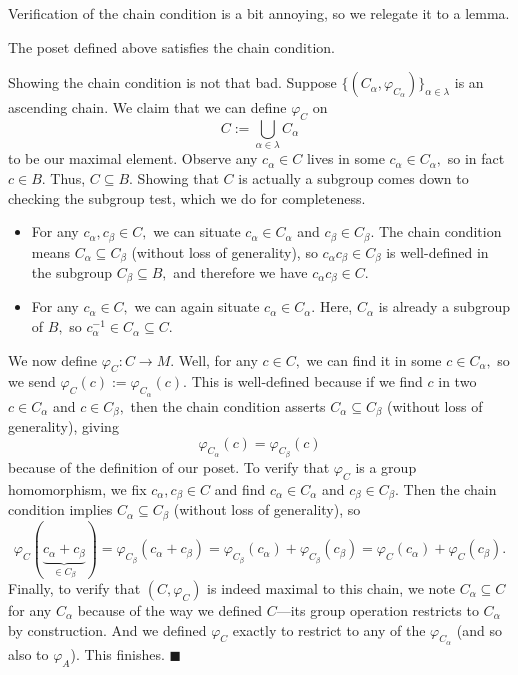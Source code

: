 Verification of the chain condition is a bit annoying, so we relegate it to a lemma.
\begin{lemma}
    The poset defined above satisfies the chain condition.
\end{lemma}
Showing the chain condition is not that bad. Suppose $\{(C_\alpha,\varphi_{C_\alpha})\}_{\alpha\in\lambda}$ is an ascending chain. We claim that we can define $\varphi_C$ on
\[C:=\bigcup_{\alpha\in\lambda}C_\alpha\]
to be our maximal element. Observe any $c_\alpha\in C$ lives in some $c_\alpha\in C_\alpha,$ so in fact $c\in B.$ Thus, $C\subseteq B.$ Showing that $C$ is actually a subgroup comes down to checking the subgroup test, which we do for completeness.
\begin{itemize}
    \item For any $c_\alpha,c_\beta\in C,$ we can situate $c_\alpha\in C_\alpha$ and $c_\beta\in C_\beta.$ The chain condition means $C_\alpha\subseteq C_\beta$ (without loss of generality), so $c_\alpha c_\beta\in C_\beta$ is well-defined in the subgroup $C_\beta\subseteq B,$ and therefore we have $c_\alpha c_\beta\in C.$
    \item For any $c_\alpha\in C,$ we can again situate $c_\alpha\in C_\alpha.$ Here, $C_\alpha$ is already a subgroup of $B,$ so $c_\alpha^{-1}\in C_\alpha\subseteq C.$
\end{itemize}
We now define $\varphi_C:C\to M.$ Well, for any $c\in C,$ we can find it in some $c\in C_\alpha,$ so we send $\varphi_C(c):=\varphi_{C_\alpha}(c).$ This is well-defined because if we find $c$ in two $c\in C_\alpha$ and $c\in C_\beta,$ then the chain condition asserts $C_\alpha\subseteq C_\beta$ (without loss of generality), giving
\[\varphi_{C_\alpha}(c)=\varphi_{C_\beta}(c)\]
because of the definition of our poset. To verify that $\varphi_C$ is a group homomorphism, we fix $c_\alpha,c_\beta\in C$ and find $c_\alpha\in C_\alpha$ and $c_\beta\in C_\beta.$ Then the chain condition implies $C_\alpha\subseteq C_\beta$ (without loss of generality), so
\[\varphi_C(\underbrace{c_\alpha+c_\beta}_{\in C_\beta})=\varphi_{C_\beta}(c_\alpha+c_\beta)=\varphi_{C_\beta}(c_\alpha)+\varphi_{C_\beta}(c_\beta)=\varphi_C(c_\alpha)+\varphi_C(c_\beta).\]
Finally, to verify that $(C,\varphi_C)$ is indeed maximal to this chain, we note $C_\alpha\subseteq C$ for any $C_\alpha$ because of the way we defined $C$---its group operation restricts to $C_\alpha$ by construction. And we defined $\varphi_C$ exactly to restrict to any of the $\varphi_{C_\alpha}$ (and so also to $\varphi_A$). This finishes. $\blacksquare$

